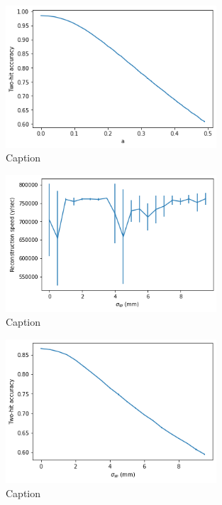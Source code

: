 \begin{figure}
    \centering
    \includegraphics[width=0.7\textwidth]{graphs/pi_enNoise_acc.png}
    \caption{Caption}
    \label{fig:my_label}
\end{figure}

\begin{figure}
    \centering
    \includegraphics[width=0.7\textwidth]{graphs/pi_spNoise_speed.png}
    \caption{Caption}
    \label{fig:my_label}
\end{figure}

\begin{figure}
    \centering
    \includegraphics[width=0.7\textwidth]{graphs/pi_spNoise_acc.png}
    \caption{Caption}
    \label{fig:my_label}
\end{figure}

